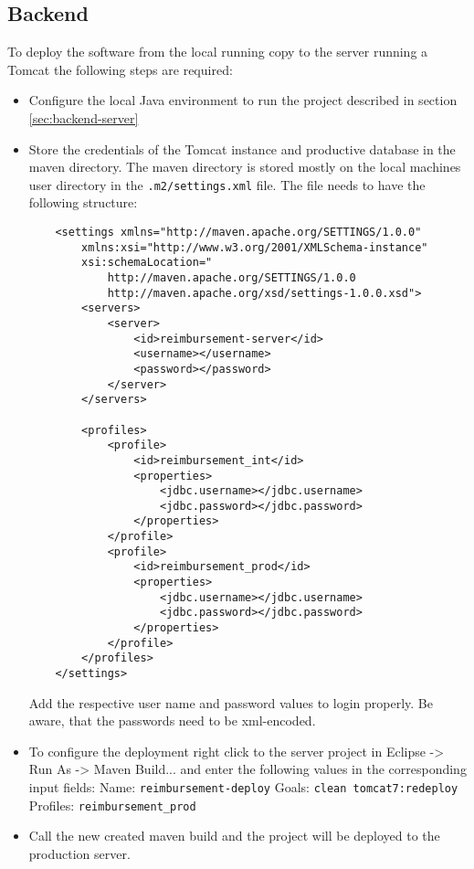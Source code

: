 \subsection{Backend}

To deploy the software from the local running copy to the server running a Tomcat the following steps are required:

\begin{itemize}
    \item Configure the local Java environment to run the project described in section \ref{sec:backend-server}
    \item Store the credentials of the Tomcat instance and productive database in the maven directory. The maven directory is stored mostly on the local machines user directory in the \texttt{.m2/settings.xml} file. The file needs to have the following structure:

    \begin{lstlisting}
    <settings xmlns="http://maven.apache.org/SETTINGS/1.0.0"
        xmlns:xsi="http://www.w3.org/2001/XMLSchema-instance"
        xsi:schemaLocation="
            http://maven.apache.org/SETTINGS/1.0.0
            http://maven.apache.org/xsd/settings-1.0.0.xsd">
    	<servers>
    		<server>
    			<id>reimbursement-server</id>
    			<username></username>
    			<password></password>
    		</server>
    	</servers>

    	<profiles>
    		<profile>
    			<id>reimbursement_int</id>
    			<properties>
    				<jdbc.username></jdbc.username>
    				<jdbc.password></jdbc.password>
    			</properties>
    		</profile>
    		<profile>
    			<id>reimbursement_prod</id>
    			<properties>
    				<jdbc.username></jdbc.username>
    				<jdbc.password></jdbc.password>
    			</properties>
    		</profile>
    	</profiles>
    </settings>
    \end{lstlisting}

    Add the respective user name and password values to login properly. Be aware, that the passwords need to be xml-encoded.

    \item To configure the deployment right click to the server project in Eclipse -> Run As -> Maven Build... and enter the following values in the corresponding input fields:
    \newline
    Name: \texttt{reimbursement-deploy}
    \newline
    Goals: \texttt{clean tomcat7:redeploy}
    \newline
    Profiles: \texttt{reimbursement\_prod}
    \item Call the new created maven build and the project will be deployed to the production server.

\end{itemize}

